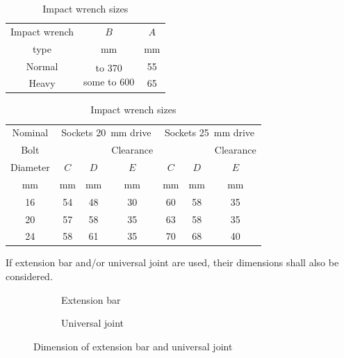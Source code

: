 \begin{table}[H]
\centering\caption{Impact wrench sizes \citep{ASI2016}}
\begin{tabular}{ccc}
	\toprule
	Impact wrench &                                $B$                                &   $A$    \\
	    type      &                             \si{\mm}                              & \si{\mm} \\ \midrule
	   Normal     & \multirow{2}[0]{*}{\parbox{5cm}{\centering{}to 370\\some to 600}} &    55    \\
	    Heavy     &                                                                   &    65    \\ \bottomrule
\end{tabular}
\end{table}
\begin{table}[H]
\centering\caption{Impact wrench sizes \citep{ASI2016}}
\begin{tabular}{ccccccc}
	\toprule
	Nominal  & \multicolumn{3}{c}{Sockets \SI{20}{\mm} drive} & \multicolumn{3}{c}{Sockets \SI{25}{\mm} drive} \\
	  Bolt   &          &          &        Clearance         &          &          &        Clearance         \\
	Diameter &   $C$    &   $D$    &           $E$            &   $C$    &   $D$    &           $E$            \\
	\si{\mm} & \si{\mm} & \si{\mm} &         \si{\mm}         & \si{\mm} & \si{\mm} &         \si{\mm}         \\ \midrule
	   16    &    54    &    48    &            30            &    60    &    58    &            35            \\
	   20    &    57    &    58    &            35            &    63    &    58    &            35            \\
	   24    &    58    &    61    &            35            &    70    &    68    &            40            \\ \bottomrule
\end{tabular}
\end{table}

If extension bar and/or universal joint are used, their dimensions shall also be considered.
\begin{figure}[H]
\centering
\begin{subfigure}{.49\linewidth}\centering

\caption{Extension bar}
\end{subfigure}\hfill
\begin{subfigure}{.49\linewidth}\centering

\caption{Universal joint}
\end{subfigure}
\caption{Dimension of extension bar and universal joint \citep{ASI2016}}
\end{figure}
